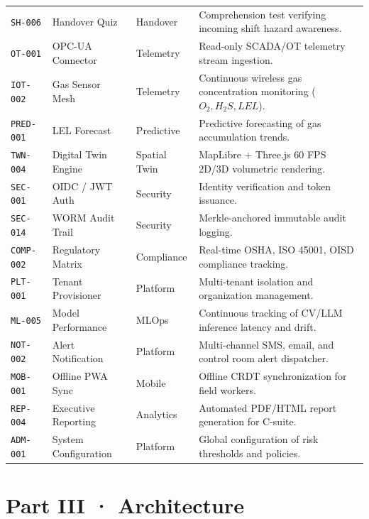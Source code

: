 \documentclass[11pt,a4paper]{article}
\begin{document}
\begin{table}[htbp]
\begin{tabularx}{\textwidth}{
>{\ttfamily\raggedright\arraybackslash}p{}
>{\raggedright\arraybackslash}p{}
>{\raggedright\arraybackslash}p{}
>{\raggedright\arraybackslash}X
}
\texttt{SH-006} & Handover Quiz & Handover & Comprehension test verifying incoming shift hazard awareness. \\
\texttt{OT-001} & OPC-UA Connector & Telemetry & Read-only SCADA/OT telemetry stream ingestion. \\
\texttt{IOT-002} & Gas Sensor Mesh & Telemetry & Continuous wireless gas concentration monitoring ($O_2, H_2S, LEL$). \\
\texttt{PRED-001} & LEL Forecast & Predictive & Predictive forecasting of gas accumulation trends. \\
\texttt{TWN-004} & Digital Twin Engine & Spatial Twin & MapLibre + Three.js 60 FPS 2D/3D volumetric rendering. \\
\texttt{SEC-001} & OIDC / JWT Auth & Security & Identity verification and token issuance. \\
\texttt{SEC-014} & WORM Audit Trail & Security & Merkle-anchored immutable audit logging. \\
\texttt{COMP-002} & Regulatory Matrix & Compliance & Real-time OSHA, ISO 45001, OISD compliance tracking. \\
\texttt{PLT-001} & Tenant Provisioner & Platform & Multi-tenant isolation and organization management. \\
\texttt{ML-005} & Model Performance & MLOps & Continuous tracking of CV/LLM inference latency and drift. \\
\texttt{NOT-002} & Alert Notification & Platform & Multi-channel SMS, email, and control room alert dispatcher. \\
\texttt{MOB-001} & Offline PWA Sync & Mobile & Offline CRDT synchronization for field workers. \\
\texttt{REP-004} & Executive Reporting & Analytics & Automated PDF/HTML report generation for C-suite. \\
\texttt{ADM-001} & System Configuration & Platform & Global configuration of risk thresholds and policies. \\
\bottomrule
\end{tabularx}
\end{table}

\newpage
\section*{Part III · Architecture}
\end{document}
